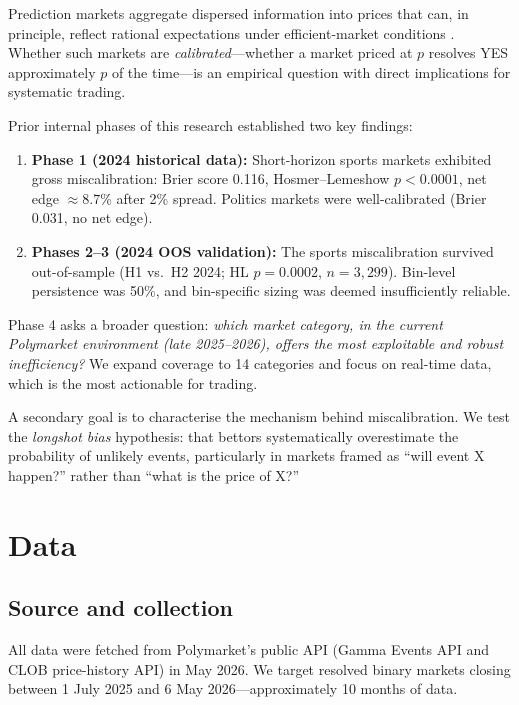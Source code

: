 \documentclass[11pt,a4paper]{article}
\begin{document}
Prediction markets aggregate dispersed information into prices that can, in
principle, reflect rational expectations under efficient-market conditions
\citep{hayek1945use,wolfers2004prediction}.
Whether such markets are \emph{calibrated}---whether a market priced at $p$
resolves YES approximately $p$ of the time---is an empirical question with
direct implications for systematic trading.

Prior internal phases of this research established two key findings:
\begin{enumerate}[leftmargin=*]
  \item \textbf{Phase 1 (2024 historical data):} Short-horizon sports markets
        exhibited gross miscalibration: Brier score 0.116, Hosmer--Lemeshow
        $p < 0.0001$, net edge $\approx 8.7\%$ after 2\% spread.
        Politics markets were well-calibrated (Brier 0.031, no net edge).
  \item \textbf{Phases 2--3 (2024 OOS validation):} The sports miscalibration
        survived out-of-sample (H1 vs.\ H2 2024; HL $p = 0.0002$, $n = 3{,}299$).
        Bin-level persistence was 50\%, and bin-specific sizing was deemed
        insufficiently reliable.
\end{enumerate}

Phase 4 asks a broader question: \emph{which market category, in the current
Polymarket environment (late 2025--2026), offers the most exploitable and
robust inefficiency?} We expand coverage to 14 categories and focus on
real-time data, which is the most actionable for trading.

A secondary goal is to characterise the mechanism behind miscalibration.
We test the \emph{longshot bias} hypothesis: that bettors systematically
overestimate the probability of unlikely events, particularly in markets
framed as ``will event X happen?'' rather than ``what is the price of X?''

\section{Data}

\subsection{Source and collection}

All data were fetched from Polymarket's public API (Gamma Events API and
CLOB price-history API) in May 2026.
We target resolved binary markets closing between 1 July 2025 and
6 May 2026---approximately 10 months of data.
\end{document}
